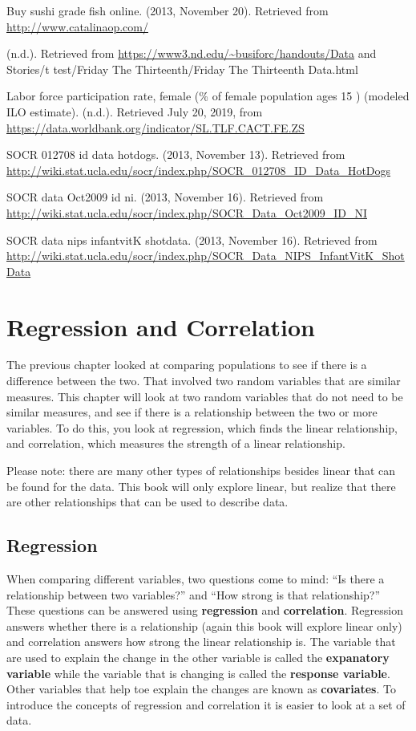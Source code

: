 \documentclass[]{book}
\begin{document}
Buy sushi grade fish online. (2013, November 20). Retrieved from \url{http://www.catalinaop.com/}

(n.d.). Retrieved from \url{https://www3.nd.edu/~busiforc/handouts/Data} and Stories/t test/Friday The Thirteenth/Friday The Thirteenth Data.html

Labor force participation rate, female (\% of female population ages 15 ) (modeled ILO estimate). (n.d.). Retrieved July 20, 2019, from \url{https://data.worldbank.org/indicator/SL.TLF.CACT.FE.ZS}

SOCR 012708 id data hotdogs. (2013, November 13). Retrieved from
\url{http://wiki.stat.ucla.edu/socr/index.php/SOCR_012708_ID_Data_HotDogs}

SOCR data Oct2009 id ni. (2013, November 16). Retrieved from
\url{http://wiki.stat.ucla.edu/socr/index.php/SOCR_Data_Oct2009_ID_NI}

SOCR data nips infantvitK shotdata. (2013, November 16). Retrieved from
\url{http://wiki.stat.ucla.edu/socr/index.php/SOCR_Data_NIPS_InfantVitK_ShotData}

\hypertarget{regression-and-correlation}{%
\chapter{Regression and Correlation}\label{regression-and-correlation}}

The previous chapter looked at comparing populations to see if there is a difference between the two. That involved two random variables that are similar measures. This chapter will look at two random variables that do not need to be similar measures, and see if there is a relationship between the two or more variables. To do this, you look at regression, which finds the linear relationship, and correlation, which measures the strength of a linear relationship.

Please note: there are many other types of relationships besides linear that can be found for the data. This book will only explore linear, but realize that there are other relationships that can be used to describe data.

\hypertarget{regression}{%
\section{Regression}\label{regression}}

When comparing different variables, two questions come to mind: ``Is there a relationship between two variables?'' and ``How strong is that relationship?'' These questions can be answered using \textbf{regression} and \textbf{correlation}. Regression answers whether there is a relationship (again this book will explore linear only) and correlation answers how strong the linear relationship is. The variable that are used to explain the change in the other variable is called the \textbf{expanatory variable} while the variable that is changing is called the \textbf{response variable}. Other variables that help toe explain the changes are known as \textbf{covariates}. To introduce the concepts of regression and correlation it is easier to look at a set of data.
\end{document}
